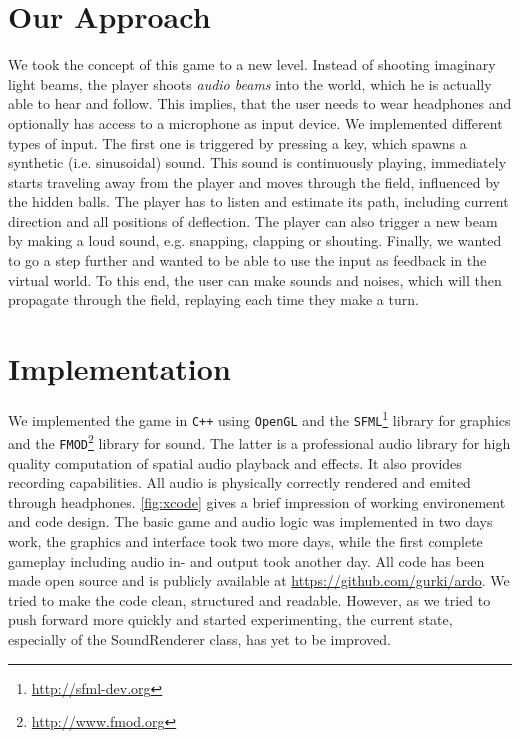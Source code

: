 \documentclass[conference]{IEEEtran}
\begin{document}
\section{Our Approach}
We took the concept of this game to a new level.
Instead of shooting imaginary light beams, the player shoots \textit{audio beams} into the world, which he is actually able to hear and follow. 
This implies, that the user needs to wear headphones and optionally has access to a microphone as input device.
We implemented different types of input.
The first one is triggered by pressing a key, which spawns a synthetic (i.e. sinusoidal) sound.
This sound is continuously playing, immediately starts traveling away from the player and moves through the field, influenced by the hidden balls.
The player has to listen and estimate its path, including current direction and all positions of deflection.
The player can also trigger a new beam by making a loud sound, e.g. snapping, clapping or shouting.
Finally, we wanted to go a step further and wanted to be able to use the input as feedback in the virtual world.
To this end, the user can make sounds and noises, which will then propagate through the field, replaying each time they make a turn.
% 
% 
\section{Implementation}
We implemented the game in \texttt{C++} using \texttt{OpenGL} and the \texttt{SFML}\footnote{\url{http://sfml-dev.org}} library for graphics and the \texttt{FMOD}\footnote{\url{http://www.fmod.org}} library for sound.
The latter is a professional audio library for high quality computation of spatial audio playback and effects. 
It also provides recording capabilities.
All audio is physically correctly rendered and emited through headphones.
\cref{fig:xcode} gives a brief impression of working environement and code design.
The basic game and audio logic was implemented in two days work, the graphics and interface took two more days, while the first complete gameplay including audio in- and output took another day.
All code has been made open source and is publicly available at \url{https://github.com/gurki/ardo}.
We tried to make the code clean, structured and readable.
However, as we tried to push forward more quickly and started experimenting, the current state, especially of the SoundRenderer class, has yet to be improved.
% 
% 
\end{document}

